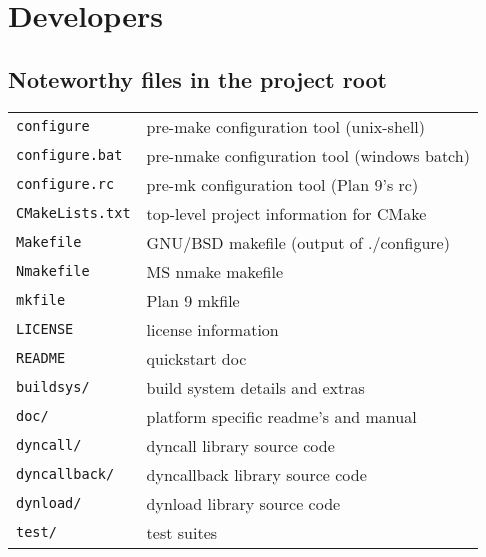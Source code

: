 %
%
%
%

\newpage
\section{Developers}

\subsection{Noteworthy files in the project root}
\begin{tabular*}{0.75\textwidth}{ll}
{\tt configure}      & pre-make configuration tool (unix-shell)     \\
{\tt configure.bat}  & pre-nmake configuration tool (windows batch) \\
{\tt configure.rc}   & pre-mk configuration tool (Plan 9's rc)      \\
{\tt CMakeLists.txt} & top-level project information for CMake      \\
{\tt Makefile}       & GNU/BSD makefile (output of ./configure)     \\
{\tt Nmakefile}      & MS nmake makefile                            \\
{\tt mkfile}         & Plan 9 mkfile                                \\
{\tt LICENSE}        & license information                          \\
{\tt README}         & quickstart doc                               \\
{\tt buildsys/}      & build system details and extras              \\
{\tt doc/}           & platform specific readme's and manual        \\
{\tt dyncall/}       & dyncall library source code                  \\
{\tt dyncallback/}   & dyncallback library source code              \\
{\tt dynload/}       & dynload library source code                  \\
{\tt test/}          & test suites                                  \\
\end{tabular*}


